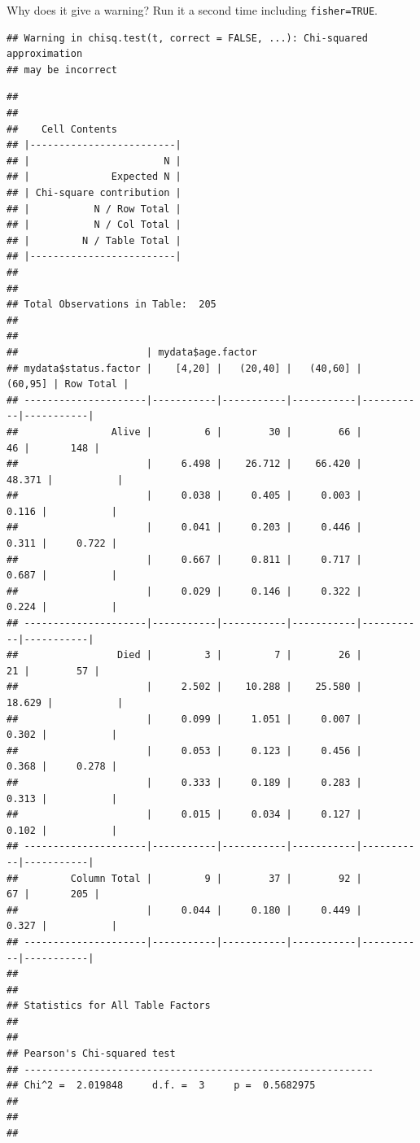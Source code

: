\documentclass[12pt,]{krantz}
\makeatletter
\newenvironment{Shaded}{\begin{snugshade}}{\end{snugshade}}
\newcommand{\DataTypeTok}[1]{\textcolor[rgb]{0.13,0.29,0.53}{#1}}
\newcommand{\KeywordTok}[1]{\textcolor[rgb]{0.13,0.29,0.53}{\textbf{#1}}}
\newcommand{\NormalTok}[1]{#1}
\newcommand{\OperatorTok}[1]{\textcolor[rgb]{0.81,0.36,0.00}{\textbf{#1}}}
\newcommand{\OtherTok}[1]{\textcolor[rgb]{0.56,0.35,0.01}{#1}}
\newenvironment{kframe}{%
\medskip{}
\setlength{\fboxsep}{.8em}
 \def\at@end@of@kframe{}%
 \ifinner\ifhmode%
  \def\at@end@of@kframe{\end{minipage}}%
  \begin{minipage}{\columnwidth}%
 \fi\fi%
 \def\FrameCommand##1{\hskip\@totalleftmargin \hskip-\fboxsep
 \colorbox{shadecolor}{##1}\hskip-\fboxsep
     \hskip-\linewidth \hskip-\@totalleftmargin \hskip\columnwidth}%
 \MakeFramed {\advance\hsize-\width
   \@totalleftmargin\z@ \linewidth\hsize
   \@setminipage}}%
 {\par\unskip\endMakeFramed%
 \at@end@of@kframe}
\renewenvironment{Shaded}{\begin{kframe}}{\end{kframe}}
\theoremstyle{definition}
\theoremstyle{definition}
\theoremstyle{definition}
\theoremstyle{remark}
\makeatother
\begin{document}
Why does it give a warning? Run it a second time including
\texttt{fisher=TRUE}.

\begin{Shaded}
\end{Shaded}

\begin{verbatim}
## Warning in chisq.test(t, correct = FALSE, ...): Chi-squared approximation
## may be incorrect
\end{verbatim}

\begin{verbatim}
## 
##  
##    Cell Contents
## |-------------------------|
## |                       N |
## |              Expected N |
## | Chi-square contribution |
## |           N / Row Total |
## |           N / Col Total |
## |         N / Table Total |
## |-------------------------|
## 
##  
## Total Observations in Table:  205 
## 
##  
##                      | mydata$age.factor 
## mydata$status.factor |    [4,20] |   (20,40] |   (40,60] |   (60,95] | Row Total | 
## ---------------------|-----------|-----------|-----------|-----------|-----------|
##                Alive |         6 |        30 |        66 |        46 |       148 | 
##                      |     6.498 |    26.712 |    66.420 |    48.371 |           | 
##                      |     0.038 |     0.405 |     0.003 |     0.116 |           | 
##                      |     0.041 |     0.203 |     0.446 |     0.311 |     0.722 | 
##                      |     0.667 |     0.811 |     0.717 |     0.687 |           | 
##                      |     0.029 |     0.146 |     0.322 |     0.224 |           | 
## ---------------------|-----------|-----------|-----------|-----------|-----------|
##                 Died |         3 |         7 |        26 |        21 |        57 | 
##                      |     2.502 |    10.288 |    25.580 |    18.629 |           | 
##                      |     0.099 |     1.051 |     0.007 |     0.302 |           | 
##                      |     0.053 |     0.123 |     0.456 |     0.368 |     0.278 | 
##                      |     0.333 |     0.189 |     0.283 |     0.313 |           | 
##                      |     0.015 |     0.034 |     0.127 |     0.102 |           | 
## ---------------------|-----------|-----------|-----------|-----------|-----------|
##         Column Total |         9 |        37 |        92 |        67 |       205 | 
##                      |     0.044 |     0.180 |     0.449 |     0.327 |           | 
## ---------------------|-----------|-----------|-----------|-----------|-----------|
## 
##  
## Statistics for All Table Factors
## 
## 
## Pearson's Chi-squared test 
## ------------------------------------------------------------
## Chi^2 =  2.019848     d.f. =  3     p =  0.5682975 
## 
## 
## 
\end{verbatim}
\end{document}
